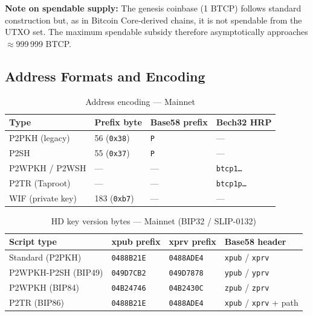 \documentclass[12pt, a4paper]{article}
\begin{document}
\textbf{Note on spendable supply:} The genesis coinbase (1 BTCP) follows
standard construction but, as in Bitcoin Core-derived chains, it is not
spendable from the UTXO set.  The maximum spendable subsidy therefore
asymptotically approaches \(\approx\)999\,999 BTCP.

\newpage
\subsection{Address Formats and Encoding}

\begin{table}[h!]
\centering
\caption{Address encoding — Mainnet}
\begin{tabular}{@{}llll@{}}
\toprule
\textbf{Type}        & \textbf{Prefix byte} & \textbf{Base58 prefix} & \textbf{Bech32 HRP} \\
\midrule
P2PKH (legacy)       & 56 (\texttt{0x38})  & \texttt{P}             & — \\
P2SH                 & 55 (\texttt{0x37})  & \texttt{P}             & — \\
P2WPKH / P2WSH       & —                   & —                      & \texttt{btcp1\ldots} \\
P2TR (Taproot)       & —                   & —                      & \texttt{btcp1p\ldots} \\
WIF (private key)    & 183 (\texttt{0xb7}) & —                      & — \\
\bottomrule
\end{tabular}
\end{table}

\begin{table}[h!]
\centering
\caption{HD key version bytes — Mainnet (BIP32 / SLIP-0132)}
\begin{tabular}{@{}llll@{}}
\toprule
\textbf{Script type} & \textbf{xpub prefix} & \textbf{xprv prefix} & \textbf{Base58 header} \\
\midrule
Standard (P2PKH)    & \texttt{0488B21E} & \texttt{0488ADE4} & \texttt{xpub} / \texttt{xprv} \\
P2WPKH-P2SH (BIP49) & \texttt{049D7CB2} & \texttt{049D7878} & \texttt{ypub} / \texttt{yprv} \\
P2WPKH (BIP84)      & \texttt{04B24746} & \texttt{04B2430C} & \texttt{zpub} / \texttt{zprv} \\
P2TR (BIP86)        & \texttt{0488B21E} & \texttt{0488ADE4} & \texttt{xpub} / \texttt{xprv} + path \\
\bottomrule
\end{tabular}
\end{table}
\end{document}
